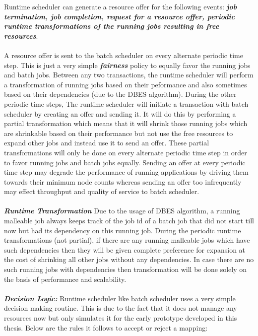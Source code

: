 Runtime scheduler can generate a resource offer for the following events: \textbf{\textit{job termination, job completion, request for a resource offer, periodic runtime transformations of the running jobs resulting in free resources}}.\\ \\
A resource offer is sent to the batch scheduler on every alternate periodic time step. This is just a very simple \textbf{\textit{fairness}} policy to equally favor the running jobs and batch jobs. Between any two transactions, the runtime scheduler will perform a transformation of running jobs based on their peformance and also sometimes based on their dependencies (due to the DBES algorithm). During the other periodic time steps, The runtime scheduler will initiate a transaction with batch scheduler by creating an offer and sending it. It will do this by performing a partial transformation which means that it will shrink those running jobs which are shrinkable based on their performance but not use the free resources to expand other jobs and instead use it to send an offer. These partial transformations will only be done on every alternate periodic time step in order to favor running jobs and batch jobs equally. Sending an offer at every periodic time step may degrade the performance of running applications by driving them towards their minimum node counts whereas sending an offer too infrequently may effect throughput and quality of service to batch scheduler.\\ \\
\textbf{\textit{Runtime Transformation}} Due to the usage of DBES algorithm, a running malleable job always keeps track of the job id of a batch job that did not start till now but had its dependency on this running job. During the periodic runtime transformations (not partial), if there are any running malleable jobs which have such dependencies then they will be given complete preference for expansion at the cost of shrinking all other jobs without any dependencies. In case there are no such running jobs with dependencies then transformation will be done solely on the basis of performance and scalability.\\ \\
\noindent
\textbf{\textit{Decision Logic:}} Runtime scheduler like batch scheduler uses a very simple decision making routine. This is due to the fact that it does not manage any resources now but only simulates it for the early prototype developed in this thesis. Below are the rules it follows to accept or reject a mapping:
